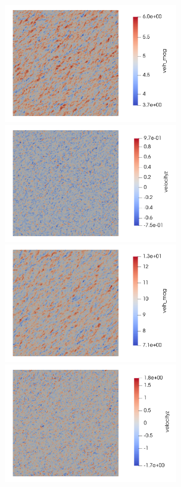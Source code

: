 \begin{figure}[hbt!]
  \centering
   \\
  \includegraphics[width=3.0in]{figures/snapshots/05ms/velh_mag_z20.png}
  \includegraphics[width=3.0in]{figures/snapshots/05ms/velz_z20.png} \\
  
  \includegraphics[width=3.0in]{figures/snapshots/10ms/velh_mag_z20.png}
  \includegraphics[width=3.0in]{figures/snapshots/10ms/velz_z20.png} \\
  

\end{figure}
